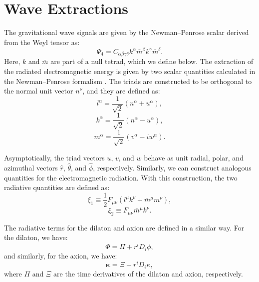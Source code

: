 \section{Wave Extractions}  
The gravitational wave signals are given by the Newman--Penrose scalar derived from the Weyl tensor as:
\begin{equation}
    \Psi_4 = C_{\alpha \beta \gamma \delta} k^{\alpha} \bar{m}^{\beta} k^{\gamma} \bar{m}^{\delta}.
\end{equation}
Here, $k$ and $\bar{m}$ are part of a null tetrad, which we define below.  
The extraction of the radiated electromagnetic energy is given by two scalar quantities calculated in the Newman--Penrose formalism \cite{Newman1962,Zilhao2014,Bruegmann2011}.  
The triads are constructed to be orthogonal to the normal unit vector $n^{\nu}$, and they are defined as:
\begin{equation}
    l^{\alpha} = \frac{1}{\sqrt{2}}\left(n^{\alpha} + u^{\alpha}\right),
\end{equation}
\begin{equation}
    k^{\alpha} = \frac{1}{\sqrt{2}}\left(n^{\alpha} - u^{\alpha}\right),
\end{equation}
\begin{equation}
    m^{\alpha} = \frac{1}{\sqrt{2}}\left(v^{\alpha} - i w^{\alpha}\right).
\end{equation}

Asymptotically, the triad vectors \(u\), \(v\), and \(w\) behave as unit radial, polar, and azimuthal vectors \(\hat{r}\), \(\hat{\theta}\), and \(\hat{\phi}\), respectively.  
Similarly, we can construct analogous quantities for the electromagnetic radiation.  
With this construction, the two radiative quantities are defined as:
\[
\xi_1 \equiv \frac{1}{2} F_{\mu \nu} \left(l^{\mu} k^{\nu} + \bar{m}^{\mu} m^{\nu}\right),
\]
\[
\xi_2 \equiv F_{\mu \nu} \bar{m}^{\mu} k^{\nu}.
\]

The radiative terms for the dilaton and axion are defined in a similar way.  
For the dilaton, we have:
\begin{equation}
    \Phi = \Pi + r^i D_i \phi,
\end{equation}
and similarly, for the axion, we have:
\begin{equation}
    \bm{\kappa} = \Xi + r^i D_i \kappa,
\end{equation}
where $\Pi$ and $\Xi$ are the time derivatives of the dilaton and axion, respectively.  

